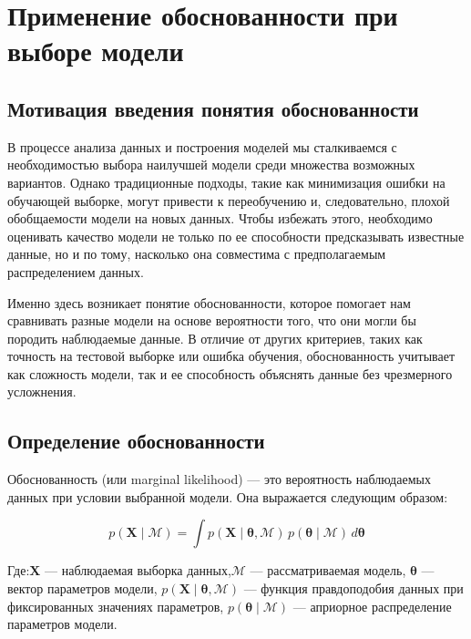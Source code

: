 \section{Применение обоснованности при выборе модели}

\subsection{Мотивация введения понятия обоснованности}

В процессе анализа данных и построения моделей мы сталкиваемся с необходимостью выбора наилучшей модели среди множества возможных вариантов. Однако традиционные подходы, такие как минимизация ошибки на обучающей выборке, могут привести к переобучению и, следовательно, плохой обобщаемости модели на новых данных. Чтобы избежать этого, необходимо оценивать качество модели не только по ее способности предсказывать известные данные, но и по тому, насколько она совместима с предполагаемым распределением данных.

Именно здесь возникает понятие обоснованности, которое помогает нам сравнивать разные модели на основе вероятности того, что они могли бы породить наблюдаемые данные. В отличие от других критериев, таких как точность на тестовой выборке или ошибка обучения, обоснованность учитывает как сложность модели, так и ее способность объяснять данные без чрезмерного усложнения.

\subsection{Определение обоснованности}

Обоснованность (или marginal likelihood) — это вероятность наблюдаемых данных при условии выбранной модели. Она выражается следующим образом:

\begin{equation}
    p(\mathbf{X} \mid \mathcal{M}) = \int p(\mathbf{X} \mid \boldsymbol{\theta}, \mathcal{M}) \, p(\boldsymbol{\theta} \mid \mathcal{M}) \, d\boldsymbol{\theta}
\end{equation}

Где:$\mathbf{X}$ — наблюдаемая выборка данных,$\mathcal{M}$ — рассматриваемая модель, $\boldsymbol{\theta}$ — вектор параметров модели, $p(\mathbf{X} \mid \boldsymbol{\theta}, \mathcal{M})$ — функция правдоподобия данных при фиксированных значениях параметров, $p(\boldsymbol{\theta} \mid \mathcal{M})$ — априорное распределение параметров модели.

